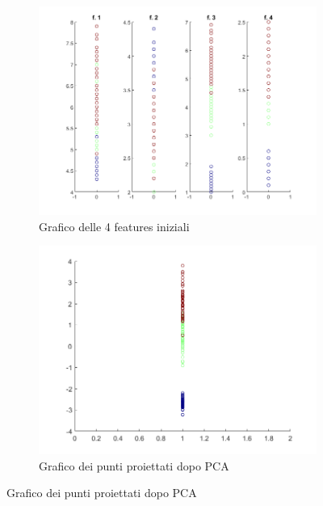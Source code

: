 \documentclass[a4paper,oneside,titlepage]{book}
\begin{document}
\begin{figure}[htp]
	\begin{subfigure}{0.49\textwidth}
	    \centering
		\includegraphics[width=\textwidth, height=\textheight, keepaspectratio]{pca-matlab-1.png}
		\caption{Grafico delle 4 features iniziali}
	\end{subfigure}
	\hfill
	\begin{subfigure}{0.49\textwidth}
	    \centering
		\includegraphics[width=\textwidth, height=\textheight, keepaspectratio]{pca-matlab-2.png}
		\caption{Grafico dei punti proiettati dopo PCA}
	\end{subfigure}
\end{figure}
\end{document}
